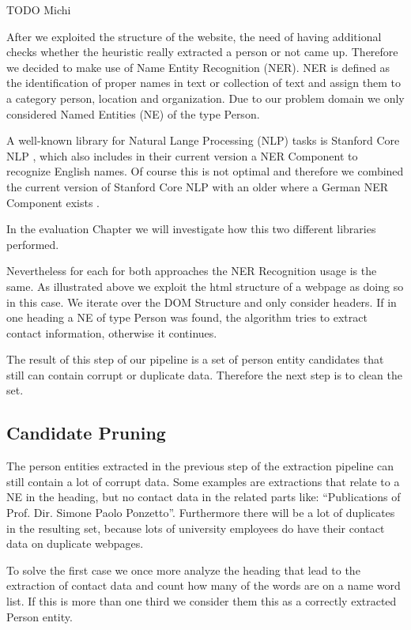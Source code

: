 \documentclass[11pt,titlepage,oneside,openany]{article}
\begin{document}
TODO Michi

After we exploited the structure of the website, the need of having additional checks whether the heuristic really extracted a person or not came up. Therefore we decided to make use of Name Entity Recognition (NER). NER is defined as the identification of proper names in text or collection of text and assign them to a category person, location and organization. Due to our problem domain we only considered Named Entities (NE) of the type Person. 

A well-known library for Natural Lange Processing (NLP) tasks is Stanford Core NLP \cite{manning2014}, which also includes in their current version a NER Component to recognize English names. Of course this is not optimal and therefore we combined the current version of Stanford Core NLP with an older where a German NER Component exists \cite{faruqui10}. 

In the evaluation Chapter we will investigate how this two different libraries performed. 

Nevertheless for each for both approaches the NER Recognition usage is the same. As illustrated above we exploit the html structure of a webpage as doing so in this case. We iterate over the DOM Structure and only consider headers. If in one heading a NE of type Person was found, the algorithm tries to extract contact information, otherwise it continues.

The result of this step of our pipeline is a set of person entity candidates that still can contain corrupt or duplicate data. Therefore the next step is to clean the set.
\subsection{Candidate Pruning}
The person entities extracted in the previous step of the extraction pipeline can still contain a lot of corrupt data.  Some examples are extractions that relate to a NE in the heading, but no contact data in the related parts like: “Publications of Prof. Dir. Simone Paolo Ponzetto”. Furthermore there will be a lot of duplicates in the resulting set, because lots of university employees do have their contact data on duplicate webpages.

To solve the first case we once more analyze the heading that lead to the extraction of contact data and count how many of the words are on a name word list. If this is more than one third we consider them this as a correctly extracted Person entity. 
\end{document}
